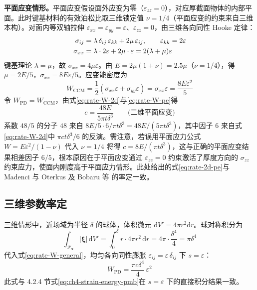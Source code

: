 \textbf{平面应变情形。}平面应变假设面外应变为零（$\varepsilon_{zz}=0$），对应厚截面物体的内部平面。此时键基材料的有效泊松比取三维锁定值 $\nu=1/4$（平面应变的约束来自三维本构）。对面内等双轴拉伸 $\varepsilon_{xx}=\varepsilon_{yy}=\varepsilon$、$\varepsilon_{zz}=0$，由三维各向同性 Hooke 定律：
\begin{align}
\sigma_{ij} &= \lambda\,\delta_{ij}\,\varepsilon_{kk} + 2\mu\,\varepsilon_{ij},\qquad
\varepsilon_{kk}=2\varepsilon \notag\\
\sigma_{xx} &= \lambda\cdot 2\varepsilon + 2\mu\cdot\varepsilon = 2(\lambda+\mu)\varepsilon
\label{eq:rate-pe-stress}
\end{align}
键基理论 $\lambda=\mu$，故 $\sigma_{xx}=4\mu\varepsilon$。由 $E=2\mu(1+\nu)=2.5\mu$（$\nu=1/4$），得 $\mu=2E/5$，$\sigma_{xx}=8E\varepsilon/5$。应变能密度为
\begin{equation}
W_{\mathrm{CCM}} = \frac{1}{2}(\sigma_{xx}\varepsilon+\sigma_{yy}\varepsilon)
= \sigma_{xx}\varepsilon = \frac{8E\varepsilon^{2}}{5}
\label{eq:rate-W-pe}
\end{equation}
令 $W_{\mathrm{PD}}=W_{\mathrm{CCM}}$，由式\eqref{eq:rate-W-2d}与\eqref{eq:rate-W-pe}得
\begin{equation}
c = \frac{48E}{5\pi t\delta^{3}} \qquad \text{(二维平面应变)}
\label{eq:rate-2d-pe}
\end{equation}
系数 $48/5$ 的分子 $48$ 来自 $8E/5\cdot 6/\pi t\delta^{3}=48E/(5\pi t\delta^{3})$，其中因子 $6$ 来自式\eqref{eq:rate-W-2d}中 $\pi c t\delta^{3}/6$ 的反演。需注意，若误用平面应力公式 $W=E\varepsilon^{2}/(1-\nu)$ 代入 $\nu=1/4$ 将得 $c=8E/(\pi t\delta^{3})$，这与正确的平面应变结果相差因子 $6/5$，根本原因在于平面应变通过 $\varepsilon_{zz}=0$ 约束激活了厚度方向的 $\sigma_{zz}$ 约束应力，使面内刚度高于平面应力情形。此处给出的式\eqref{eq:rate-2d-pe}与 Madenci 与 Oterkus \cite{MadenciOterkus2014} 及 Bobaru 等 \cite{Bobaru2016} 的率定一致。

\subsection{三维参数率定}

三维情形中，近场域为半径 $\delta$ 的球体，体积微元 $\mathrm{d}V'=4\pi r^{2}\mathrm{d}r$。球对称积分为
\begin{equation}
\int_{\mathcal{F}_{\mathbf{x}}} |\boldsymbol{\xi}|\,\mathrm{d}V' = \int_{0}^{\delta} r\cdot 4\pi r^{2}\,\mathrm{d}r
= 4\pi\cdot\frac{\delta^{4}}{4} = \pi\delta^{4}
\label{eq:rate-integral-3d}
\end{equation}
代入式\eqref{eq:rate-W-general}，均匀各向同性膨胀 $\varepsilon_{ij}=\varepsilon\,\delta_{ij}$ 下 $s=\varepsilon$：
\begin{equation}
W_{\mathrm{PD}} = \frac{\pi c\delta^{4}}{4}\,\varepsilon^{2}
\label{eq:rate-W-3d}
\end{equation}
此式与 4.2.4 节式\eqref{eq:ch4-strain-energy-pmb}在 $s=\varepsilon$ 下的直接积分结果一致。

